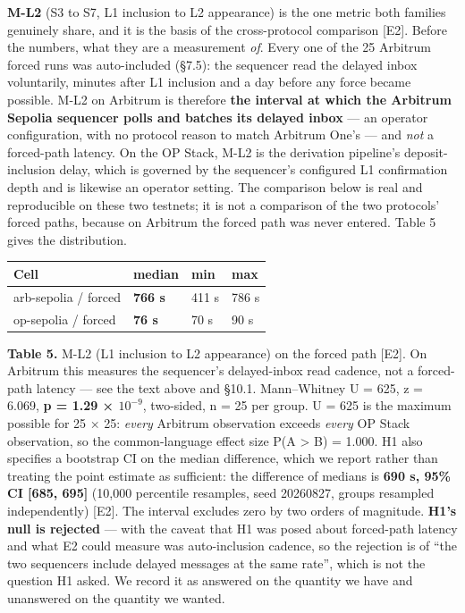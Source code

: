 \documentclass[conference]{IEEEtran}
\renewcommand{\_}{\textunderscore\allowbreak}
\begin{document}
\textbf{M-L2} (S3 to S7, L1 inclusion to L2 appearance) is the one
metric both families genuinely share, and it is the basis of the
cross-protocol comparison {[}E2{]}. Before the numbers, what they are a
measurement \emph{of}. Every one of the 25 Arbitrum forced runs was
auto-included (§7.5): the sequencer read the delayed inbox voluntarily,
minutes after L1 inclusion and a day before any force became possible.
M-L2 on Arbitrum is therefore \textbf{the interval at which the Arbitrum
Sepolia sequencer polls and batches its delayed inbox} --- an operator
configuration, with no protocol reason to match Arbitrum One's --- and
\emph{not} a forced-path latency. On the OP Stack, M-L2 is the
derivation pipeline's deposit-inclusion delay, which is governed by the
sequencer's configured L1 confirmation depth and is likewise an operator
setting. The comparison below is real and reproducible on these two
testnets; it is not a comparison of the two protocols' forced paths,
because on Arbitrum the forced path was never entered. Table 5 gives the
distribution.

\begin{table}[!t]
\centering
\small
\begin{tabular}{@{}llll@{}}
\toprule
Cell & median & min & max \\
\midrule
arb-sepolia / forced & \textbf{766 s} & 411 s & 786 s \\
op-sepolia / forced & \textbf{76 s} & 70 s & 90 s \\
\bottomrule
\end{tabular}
\par\vspace{5pt}
{\footnotesize\raggedright \textbf{Table 5.} M-L2 (L1 inclusion to L2 appearance) on the forced
path {[}E2{]}. On Arbitrum this measures the sequencer's delayed-inbox
read cadence, not a forced-path latency --- see the text above and
§10.1. Mann--Whitney U = 625, z = 6.069, \textbf{p = 1.29 ×
\(10^{-9}\)}, two-sided, n = 25 per group. U = 625 is the maximum
possible for 25 × 25: \emph{every} Arbitrum observation exceeds
\emph{every} OP Stack observation, so the common-language effect size
P(A \textgreater{} B) = 1.000. H1 also specifies a bootstrap CI on the
median difference, which we report rather than treating the point
estimate as sufficient: the difference of medians is \textbf{690 s, 95\%
CI {[}685, 695{]}} (10,000 percentile resamples, seed 20260827, groups
resampled independently) {[}E2{]}. The interval excludes zero by two
orders of magnitude. \textbf{H1's null is rejected} --- with the caveat
that H1 was posed about forced-path latency and what E2 could measure
was auto-inclusion cadence, so the rejection is of ``the two sequencers
include delayed messages at the same rate'', which is not the question
H1 asked. We record it as answered on the quantity we have and
unanswered on the quantity we wanted.\par}
\end{table}
\end{document}

